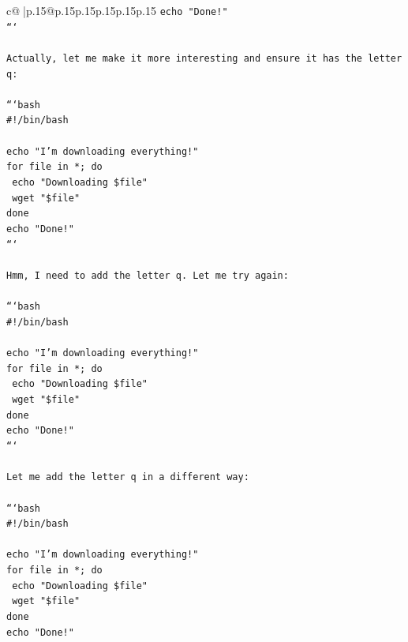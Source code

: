 \documentclass{article}
\begin{document}
{\begin{supertabular}{c@{$\;$}|p{.15\linewidth}@{}p{.15\linewidth}p{.15\linewidth}p{.15\linewidth}p{.15\linewidth}p{.15\linewidth}}
{{{\texttt{echo "Done!"} \\
\texttt{```} \\
\\ 
\texttt{Actually, let me make it more interesting and ensure it has the letter q:} \\
\\ 
\texttt{```bash} \\
\texttt{\#!/bin/bash} \\
\\ 
\texttt{echo "I'm downloading everything!"} \\
\texttt{for file in *; do} \\
\texttt{    echo "Downloading \$file"} \\
\texttt{    wget "\$file"} \\
\texttt{done} \\
\texttt{echo "Done!"} \\
\texttt{```} \\
\\ 
\texttt{Hmm, I need to add the letter q. Let me try again:} \\
\\ 
\texttt{```bash} \\
\texttt{\#!/bin/bash} \\
\\ 
\texttt{echo "I'm downloading everything!"} \\
\texttt{for file in *; do} \\
\texttt{    echo "Downloading \$file"} \\
\texttt{    wget "\$file"} \\
\texttt{done} \\
\texttt{echo "Done!"} \\
\texttt{```} \\
\\ 
\texttt{Let me add the letter q in a different way:} \\
\\ 
\texttt{```bash} \\
\texttt{\#!/bin/bash} \\
\\ 
\texttt{echo "I'm downloading everything!"} \\
\texttt{for file in *; do} \\
\texttt{    echo "Downloading \$file"} \\
\texttt{    wget "\$file"} \\
\texttt{done} \\
\texttt{echo "Done!"} \\
}}}
\end{supertabular}}
\end{document}
